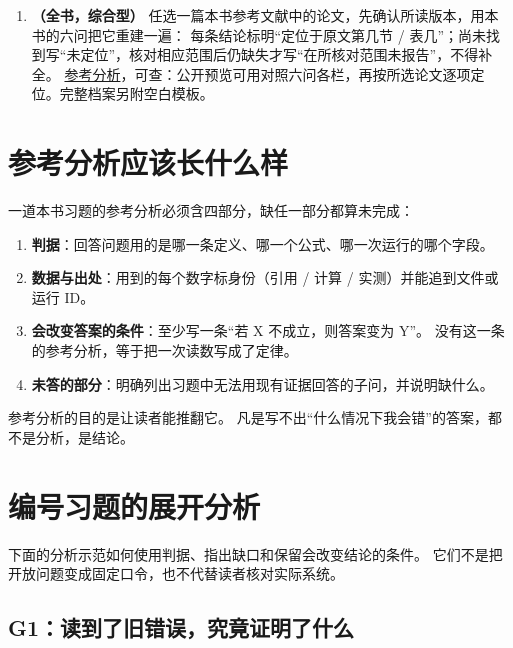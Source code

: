 \begin{enumerate}[label=G\arabic*.]
  \item\label{ex:g18} \textbf{（全书，综合型）}
        任选一篇本书参考文献中的论文，先确认所读版本，用本书的六问把它重建一遍：
        每条结论标明“定位于原文第几节 / 表几”；尚未找到写“未定位”，核对相应范围后仍缺失才写“在所核对范围未报告”，不得补全。
        \hyperref[sol:g18]{参考分析}，可查：公开预览可用对照六问各栏，再按所选论文逐项定位。完整档案另附空白模板。

\end{enumerate}

\section{参考分析应该长什么样}

\begin{sloppypar}
一道本书习题的参考分析必须含四部分，缺任一部分都算未完成：
\end{sloppypar}

\begin{enumerate}
  \item \textbf{判据}：回答问题用的是哪一条定义、哪一个公式、哪一次运行的哪个字段。
  \item \textbf{数据与出处}：用到的每个数字标身份（引用 / 计算 / 实测）并能追到文件或运行 ID。
  \item \textbf{会改变答案的条件}：至少写一条“若 X 不成立，则答案变为 Y”。
        没有这一条的参考分析，等于把一次读数写成了定律。
  \item \textbf{未答的部分}：明确列出习题中无法用现有证据回答的子问，并说明缺什么。
\end{enumerate}

\begin{principlebox}
参考分析的目的是让读者能推翻它。
凡是写不出“什么情况下我会错”的答案，都不是分析，是结论。
\end{principlebox}

\section{编号习题的展开分析}
\label{sec:appg-worked}

下面的分析示范如何使用判据、指出缺口和保留会改变结论的条件。
它们不是把开放问题变成固定口令，也不代替读者核对实际系统。

\subsection{G1：读到了旧错误，究竟证明了什么}\label{sol:g01}

